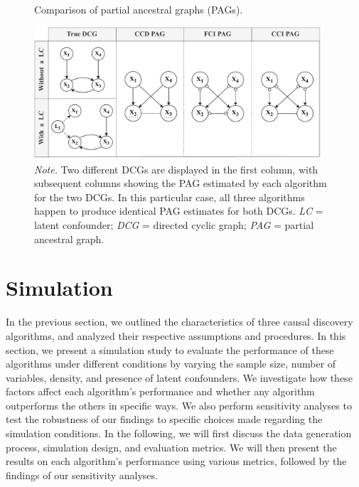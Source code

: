 \documentclass[twoside, 11pt]{article}
\begin{document}
 
\vspace{5mm}

\begin{figure}[!hb]
    \centering
        \caption{Comparison of partial ancestral graphs (PAGs).}
        \includegraphics[width=0.95\textwidth]{figures/Fig10.pdf}
        \vspace{1mm}
        \caption*{\small{\textit{Note.} Two different DCGs are displayed in the first column, with subsequent columns showing the PAG estimated by each algorithm for the two DCGs. In this particular case, all three algorithms happen to produce identical PAG estimates for both DCGs.
        \textit{LC} = latent confounder; \textit{DCG} = directed cyclic graph; \textit{PAG} = partial ancestral graph.}}
    \label{fig:10}
\end{figure}



\newpage
\section{Simulation} \label{simulation}

In the previous section, we outlined the characteristics of three causal discovery algorithms, and analyzed their respective assumptions and procedures. In this section, we present a simulation study to evaluate the performance of these algorithms under different conditions by varying the sample size, number of variables, density, and presence of latent confounders. We investigate how these factors affect each algorithm's performance and whether any algorithm outperforms the others in specific ways. We also perform sensitivity analyses to test the robustness of our findings to specific choices made regarding the simulation conditions. In the following, we will first discuss the data generation process, simulation design, and evaluation metrics. We will then present the results on each algorithm's performance using various metrics, followed by the findings of our sensitivity analyses.
\end{document}
